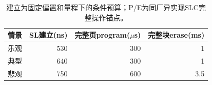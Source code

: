 \begin{table}[htbp]\centering\small
\begin{tabular}{@{}lrrr@{}}\toprule
情景 & SL建立(ns) & 完整页program($\mu$s) & 完整块erase(ms)\\\midrule
乐观 & 530 & 300 & 1\\
典型 & 640 & 300 & 1\\
悲观 & 750 & 600 & 3.5\\
\bottomrule\end{tabular}
\caption{建立为固定偏置和量程下的条件预算；P/E为同厂异实现SLC完整操作锚点。}\end{table}
